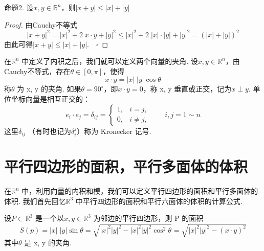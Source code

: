 \documentclass{article}
\begin{document}
\newpage

\begin{proposition}{}{}
    命题2.  设\(x, y \in \mathbb{R}^n\)，则\(| x + y | \le | x |+ | y |\)
\end{proposition}

\vspace{20pt}

\begin{proof}
    由Cauchy不等式
    \begin{equation*}
        | x + y |^2 = | x |^2 + 2\;x \cdot y + | y |^2 \le | x |^2 + 2\; | x | \cdot | y | + | y |^2 = (| x |+ | y |)^2
    \end{equation*}
    由此可得\(| x + y | \le | x |+ | y |. \quad \square\)
\end{proof}

\newpage

在\(\mathbb{R}^n\) 中定义了内积之后，我们就可以定义两个向量的夹角. 设\(x, y \in \mathbb{R}^n\)，由 Cauchy不等式，存在\(\theta \in [0, \pi]\)，使得
\begin{equation*}
    x \cdot y =| x |\; | y | \cos \theta
\end{equation*}
称\(\theta \) 为 x, y 的夹角. 如果\(\theta = 90^\circ\)，即\(x \cdot y = 0\)，称 x, y 垂直或正交，记为\(x \perp y\). 单位坐标向量是相互正交的：
\begin{equation*}
    e_i \cdot e_j =\delta_{ij} =
    \begin{cases}
        1, & i = j, \\
        0, & i \neq j,
    \end{cases}
    \qquad i,j = 1 \sim n
\end{equation*}
这里\(\delta_{ij}\) （有时也记为\(\delta_i^j\)）称为 Kronecker 记号.

\newpage

\section{平行四边形的面积，平行多面体的体积}
在\(\mathbb{R}^n\) 中，利用向量的内积和模，我们可以定义平行四边形的面积和平行多面体的体积. 我们首先回忆\(\mathbb{R}^3\) 中平行四边形的面积和平行六面体的体积的计算公式.

\vspace{20pt}
\noindent 设\(P \subset \mathbb{R}^3 \) 是一个以\(x, y \in \mathbb{R}^3\) 为邻边的平行四边形，则 P 的面积
\begin{equation*}
    S(p) = |x|\; |y| \sin \theta = \sqrt{ |x|^2 |y|^2 - |x|^2 |y|^2 \cos^2\theta} = \sqrt{ |x|^2 |y|^2 -(x \cdot y)^2}
\end{equation*}
其中\(\theta \) 是 x, y 的夹角.
\end{document}
